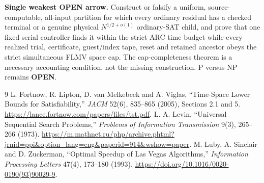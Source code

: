 \documentclass[11pt]{article}
\begin{document}
\textbf{Single weakest OPEN arrow.}
Construct or falsify a uniform, source-computable, all-input partition for
which every ordinary residual has a checked terminal or a genuine physical
$N^{1/2+o(1)}$ ordinary-SAT child, and prove that one fixed serial controller
finds it within the strict ARC time budget while every realized trial,
certificate, guest/index tape, reset and retained ancestor obeys the strict
simultaneous FLMV space cap.  The cap-completeness theorem is a necessary
accounting condition, not the missing construction.  P versus NP remains
\textbf{OPEN}.

\begin{thebibliography}{9}
 L. Fortnow, R. Lipton, D. van Melkebeek and A. Viglas,
``Time-Space Lower Bounds for Satisfiability,'' \emph{JACM} 52(6), 835--865
(2005), Sections 2.1 and 5. \url{https://lance.fortnow.com/papers/files/tst.pdf}.
 L. A. Levin, ``Universal Sequential Search Problems,''
\emph{Problems of Information Transmission} 9(3), 265--266 (1973).
\url{https://m.mathnet.ru/php/archive.phtml?jrnid=ppi&option_lang=eng&paperid=914&wshow=paper}.
 M. Luby, A. Sinclair and D. Zuckerman, ``Optimal Speedup of
Las Vegas Algorithms,'' \emph{Information Processing Letters} 47(4),
173--180 (1993). \url{https://doi.org/10.1016/0020-0190(93)90029-9}.
\end{thebibliography}
\end{document}

